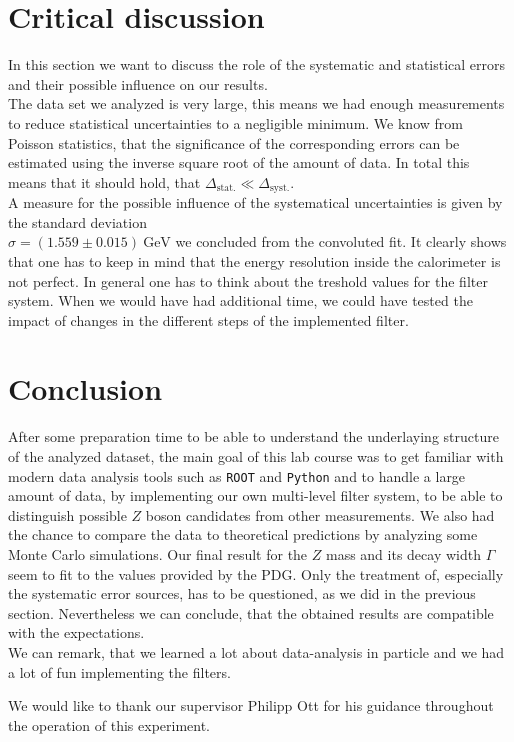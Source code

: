 \documentclass[twocolumn,
			   showpacs,%
               nofootinbib,
               aps,%
               prd,
               notitlepage,
               showkeys,
               10pt]{revtex4-1}
\begin{document}
\section{Critical discussion}
In this section we want to discuss the role of the systematic and statistical errors and their possible influence on our results.\\

The data set we analyzed is very large, this means we had enough measurements to reduce statistical uncertainties to a negligible minimum. We know from Poisson statistics, that the significance of the corresponding errors can be estimated using the inverse square root of the amount of data. In total this means that it should hold, that $\Delta_{\mathrm{stat.}} \ll \Delta_{\mathrm{syst.}}$. \\
A measure for the possible influence of the systematical uncertainties is given by the standard deviation \\ $\sigma = (1.559 \pm 0.015) \ \text{GeV}$ we concluded from the convoluted fit. It clearly shows that one has to keep in mind that the energy resolution inside the calorimeter is not perfect. In general one has to think about the treshold values for the filter system. When we would have had additional time, we could have tested the impact of changes in the different steps of the implemented filter.

\section{Conclusion}
After some preparation time to be able to understand the underlaying structure of the analyzed dataset, the main goal of this lab course was to get familiar with modern data analysis tools such as \verb|ROOT| and \verb|Python| and to handle a large amount of data, by implementing our own multi-level filter system, to be able to distinguish possible $Z$ boson candidates from other measurements. We also had the chance to compare the data to theoretical predictions by analyzing some Monte Carlo simulations. Our final result for the $Z$ mass and its decay width $\Gamma$ seem to fit to the values provided by the PDG. Only the treatment of, especially the systematic error sources,  has to  be questioned, as we did in the previous section. Nevertheless we can conclude, that the obtained results are compatible with the expectations.\\
We can remark, that we learned a lot about data-analysis in particle and we had a lot of fun implementing the filters.  
\begin{acknowledgments}
We would like to thank our supervisor Philipp Ott for his guidance throughout the operation of this experiment.
\end{acknowledgments}



\nocite{*}
\end{document}
